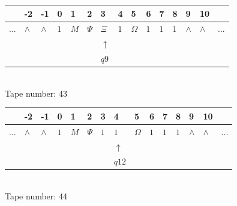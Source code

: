 \documentclass[11pt]{article}
\begin{document}
\begin{table}[H]
\centering
\begin{tabular}{lllllllllllllll}
 & -2 & -1 & 0 & 1 & 2 & 3 & 4 & 5 & 6 & 7 & 8 & 9 & 10 & \\
\hline
$...$ & \multicolumn{1}{|l|}{$\wedge$} & \multicolumn{1}{|l|}{$\wedge$} & \multicolumn{1}{|l|}{$1$} & \multicolumn{1}{|l|}{$M$} & \multicolumn{1}{|l|}{$\Psi$} & \multicolumn{1}{|l|}{$\Xi$} & \multicolumn{1}{|l|}{$1$} & \multicolumn{1}{|l|}{$\Omega$} & \multicolumn{1}{|l|}{$1$} & \multicolumn{1}{|l|}{$1$} & \multicolumn{1}{|l|}{$1$} & \multicolumn{1}{|l|}{$\wedge$} & \multicolumn{1}{|l|}{$\wedge$} & $...$\\
\hline
&  &  &  &  &  & $\uparrow$ &  &  &  &  &  &  &  &  \\
&  &  &  &  &  & $ q9 $ &  &  &  &  &  &  &  &  \\
\end{tabular}
\\
Tape number: 43
\noindent\makebox[\linewidth]{\hdashrule{\textwidth}{1pt}{1pt}}\end{table}

\begin{table}[H]
\centering
\begin{tabular}{lllllllllllllll}
 & -2 & -1 & 0 & 1 & 2 & 3 & 4 & 5 & 6 & 7 & 8 & 9 & 10 & \\
\hline
$...$ & \multicolumn{1}{|l|}{$\wedge$} & \multicolumn{1}{|l|}{$\wedge$} & \multicolumn{1}{|l|}{$1$} & \multicolumn{1}{|l|}{$M$} & \multicolumn{1}{|l|}{$\Psi$} & \multicolumn{1}{|l|}{$1$} & \multicolumn{1}{|l|}{$1$} & \multicolumn{1}{|l|}{$\Omega$} & \multicolumn{1}{|l|}{$1$} & \multicolumn{1}{|l|}{$1$} & \multicolumn{1}{|l|}{$1$} & \multicolumn{1}{|l|}{$\wedge$} & \multicolumn{1}{|l|}{$\wedge$} & $...$\\
\hline
&  &  &  &  &  &  & $\uparrow$ &  &  &  &  &  &  &  \\
&  &  &  &  &  &  & $ q12 $ &  &  &  &  &  &  &  \\
\end{tabular}
\\
Tape number: 44
\noindent\makebox[\linewidth]{\hdashrule{\textwidth}{1pt}{1pt}}\end{table}
\end{document}
